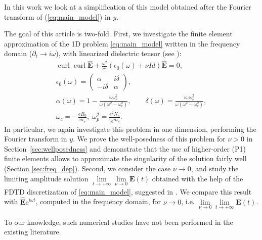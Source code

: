 In this work we look at a simplification of this model obtained after 
the Fourier transform of (\ref{eq:main_model}) in $y$. 



The goal of this article is two-fold. 
First, we investigate the finite element approximation of the 1D 
problem \eqref{eq:main_model} written in the frequency domain ($\partial_t\rightarrow i\omega$), with 
linearized dielectric tensor (see \cite{Despres_2014}):
\begin{align}
\label{eq:main_frequency_domain}
\operatorname{curl}\operatorname{curl}\hat{\mathbf{E}}+\frac{\omega^2}{c^2}
\left(\epsilon_0(\omega)+\nu Id\right)\hat{\mathbf{E}}=0,\\
\nonumber
\epsilon_0(\omega)=\left(
\begin{matrix}
 \alpha & i\delta \\
 -i\delta & \alpha 
\end{matrix}
\right), \\
\nonumber
\alpha(\omega)=1-\frac{\omega\omega_p^2}{\omega(\omega^2-\omega_c^2)},\qquad 
\nonumber
\delta(\omega)=\frac{\omega_c\omega_p^2}{\omega(\omega^2-\omega_c^2)},\\
\nonumber
\omega_c=-\frac{eB_0}{m_e},\; \omega_p^2=\frac{e^2 N_e}{\epsilon_0 m_e}.
\end{align}
\urev{Additionally, we assume $\alpha(\omega)$ and $\delta(\omega)$ be sufficiently smooth, i.e. bounded and continuous in  
$\left[-L,\; \mathbb{R}\right)$.}
In particular, we again investigate this problem in one dimension, performing the Fourier transform in $y$.
We prove the well-posedness of this problem for $\nu>0$ in Section~\ref{sec:wellposedness} and 
demonstrate that the use of higher-order (P1) finite elements allows to approximate the singularity 
of the solution fairly well (Section \ref{sec:freq_dep}). 
Second, we consider the case $\nu\rightarrow 0$, and study the limiting amplitude solution 
$\lim\limits_{t\rightarrow +\infty}\lim\limits_{\nu\rightarrow 0}\mathbf{E}(t)$ obtained with the help of 
the FDTD discretization of \eqref{eq:main_model}, suggested in \cite{stable_yee_plasma_current}. 
We compare this result with 
$\hat{\mathbf{E}}\mathrm{e}^{i\omega t}$, computed in the frequency domain, for $\nu\rightarrow 0$, i.e.
$\lim\limits_{\nu\rightarrow 0}\lim\limits_{t\rightarrow+\infty}\mathbf{E}(t)$.

To our knowledge, such numerical studies have not been performed in the existing literature. 

